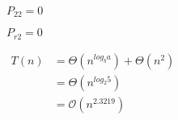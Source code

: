 \documentclass[10pt]{book}
\begin{document}
\begin{mdSnippets}
\begin{mdInlineSnippet}[b6d01a2fdafa4e4f742209c8777020a0]
$P_{22} = 0$\end{mdInlineSnippet}%
\begin{mdInlineSnippet}[ac37b18dc62ffd5b2763246706ce6202]%
$P_{r2} = 0$\end{mdInlineSnippet}%
\begin{mdInlineSnippet}[865735bd90c5811b51bb546541a03ea2]%
$\begin{aligned}T(n) &= \Theta(n^{log_{b} a}) + \Theta(n^{2})\\   &= \Theta(n^{log_{2} 5})\\ &= \mathcal{O}{(n^{2.3219})}\\\end{aligned} $\end{mdInlineSnippet}%

\end{mdSnippets}
\end{document}
